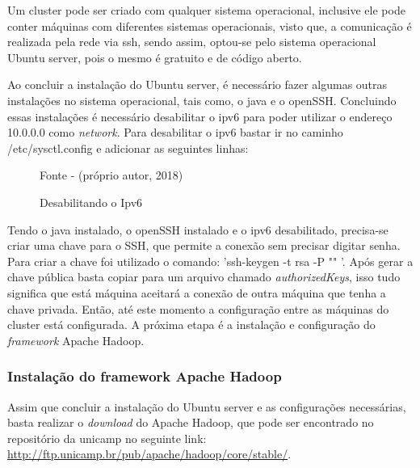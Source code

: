 Um cluster pode ser criado com qualquer sistema operacional, inclusive ele pode conter máquinas com diferentes sistemas operacionais, visto que, a comunicação é realizada pela rede via ssh, sendo assim, optou-se pelo sistema operacional Ubuntu server, pois o mesmo é gratuito e de código aberto. 

Ao concluir a instalação do Ubuntu server, é necessário fazer algumas outras instalações no sistema operacional, tais como, o java e o openSSH. Concluindo essas instalações é necessário desabilitar o ipv6 para poder utilizar o endereço 10.0.0.0 como \textit{network}. Para desabilitar o ipv6 bastar ir no caminho /etc/sysctl.config e adicionar as seguintes linhas:

\begin{figure}[htbp!] \begin{center}
    \caption{Desabilitando o Ipv6}
	\small{Fonte - (próprio autor, 2018)}
	\label{Fig:Desabilitando o Ipv6}
	\end{center} \end{figure}



Tendo o java instalado, o openSSH instalado e o ipv6 desabilitado, precisa-se criar uma chave para o SSH, que permite a conexão sem precisar digitar senha. Para criar a chave foi utilizado o comando: 'ssh-keygen -t rsa -P "" '. Após gerar a chave pública basta copiar para um arquivo chamado \textit{authorizedKeys}, isso tudo significa que está máquina aceitará a conexão de outra máquina que tenha a chave privada. Então, até este momento a configuração entre as máquinas do cluster está configurada. A próxima etapa é a instalação e configuração do \textit{framework} Apache Hadoop. 

\subsubsection{Instalação do framework Apache Hadoop}

Assim que concluir a instalação do Ubuntu server e as configurações necessárias, basta realizar o \textit{download} do Apache Hadoop, que pode ser encontrado no repositório da unicamp no seguinte link: \url{http://ftp.unicamp.br/pub/apache/hadoop/core/stable/}.

